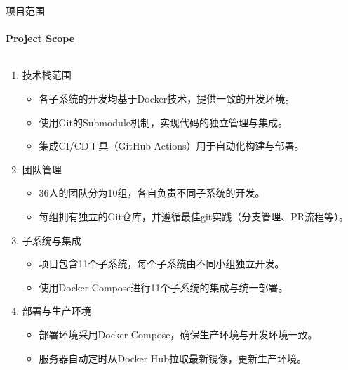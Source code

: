 \documentclass{beamer}
\begin{document}
\begin{frame}[fragile]{项目范围}
\framesubtitle{Project Scope}
\begin{columns}
\begin{column}{0.85\textwidth}
\begin{enumerate}
\item 技术栈范围
\begin{itemize}
\item 各子系统的开发均基于Docker技术，提供一致的开发环境。
\item 使用Git的Submodule机制，实现代码的独立管理与集成。
\item 集成CI/CD工具（GitHub Actions）用于自动化构建与部署。
\end{itemize}
\item 团队管理
\begin{itemize}
\item 36人的团队分为10组，各自负责不同子系统的开发。
\item 每组拥有独立的Git仓库，并遵循最佳git实践（分支管理、PR流程等）。
\end{itemize}
\item 子系统与集成
\begin{itemize}
\item 项目包含11个子系统，每个子系统由不同小组独立开发。
\item 使用Docker Compose进行11个子系统的集成与统一部署。
\end{itemize}
\item 部署与生产环境
\begin{itemize}
\item 部署环境采用Docker Compose，确保生产环境与开发环境一致。
\item 服务器自动定时从Docker Hub拉取最新镜像，更新生产环境。
\end{itemize}
\end{enumerate}
\end{column}
\end{columns}
\end{frame}
\end{document}
